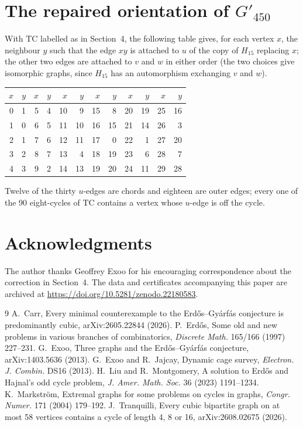 \documentclass[11pt]{article}
\theoremstyle{remark}
\theoremstyle{definition}
\newcommand{\TC}{\mathrm{TC}}
\begin{document}
\appendix
\section{The repaired orientation of \texorpdfstring{$G'_{450}$}{G'450}}

With $\TC$ labelled as in Section~4, the following table gives, for each vertex $x$, the neighbour $y$ such that the edge $xy$ is attached to $u$ of the copy of $H_{15}$ replacing $x$; the other two edges are attached to $v$ and $w$ in either order (the two choices give isomorphic graphs, since $H_{15}$ has an automorphism exchanging $v$ and $w$).

\begin{center}\small
\begin{tabular}{rr@{\qquad}rr@{\qquad}rr@{\qquad}rr@{\qquad}rr@{\qquad}rr}
\toprule
$x$&$y$&$x$&$y$&$x$&$y$&$x$&$y$&$x$&$y$&$x$&$y$\\
\midrule
0&1 & 5&4 & 10&9 & 15&8 & 20&19 & 25&16\\
1&0 & 6&5 & 11&10 & 16&15 & 21&14 & 26&3\\
2&1 & 7&6 & 12&11 & 17&0 & 22&1 & 27&20\\
3&2 & 8&7 & 13&4 & 18&19 & 23&6 & 28&7\\
4&3 & 9&2 & 14&13 & 19&20 & 24&11 & 29&28\\
\bottomrule
\end{tabular}
\end{center}
Twelve of the thirty $u$-edges are chords and eighteen are outer edges; every one of the 90 eight-cycles of $\TC$ contains a vertex whose $u$-edge is off the cycle.

\section*{Acknowledgments}
The author thanks Geoffrey Exoo for his encouraging correspondence about the correction in Section~4. The data and certificates accompanying this paper are archived at \url{https://doi.org/10.5281/zenodo.22180583}.

\begin{thebibliography}{9}
 A.~Carr, Every minimal counterexample to the Erd\H{o}s--Gy\'arf\'as conjecture is predominantly cubic, arXiv:2605.22844 (2026).
 P.~Erd\H{o}s, Some old and new problems in various branches of combinatorics, \emph{Discrete Math.} 165/166 (1997) 227--231.
 G.~Exoo, Three graphs and the Erd\H{o}s--Gy\'arf\'as conjecture, arXiv:1403.5636 (2013).
 G.~Exoo and R.~Jajcay, Dynamic cage survey, \emph{Electron. J. Combin.} DS16 (2013).
 H.~Liu and R.~Montgomery, A solution to Erd\H{o}s and Hajnal's odd cycle problem, \emph{J. Amer. Math. Soc.} 36 (2023) 1191--1234.
 K.~Markstr\"om, Extremal graphs for some problems on cycles in graphs, \emph{Congr. Numer.} 171 (2004) 179--192.
 J.~Tranquilli, Every cubic bipartite graph on at most 58 vertices contains a cycle of length 4, 8 or 16, arXiv:2608.02675 (2026).
\end{thebibliography}
\end{document}
